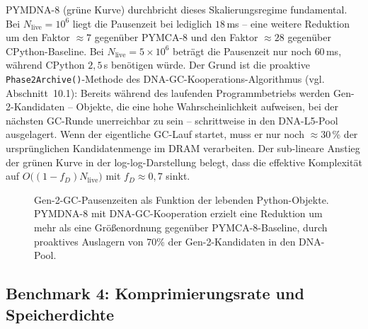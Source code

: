 ﻿\documentclass[a4paper,12pt]{article}
\theoremstyle{definition}
\begin{document}
PYMDNA-8 (grüne Kurve) durchbricht dieses Skalierungsregime fundamental. Bei $N_{\mathrm{live}} = 10^6$ liegt die Pausenzeit bei lediglich $18$\,ms -- eine weitere Reduktion um den Faktor $\approx 7$ gegenüber PYMCA-8 und den Faktor $\approx 28$ gegenüber CPython-Baseline. Bei $N_{\mathrm{live}} = 5 \times 10^6$ beträgt die Pausenzeit nur noch $60$\,ms, während CPython $2{,}5$\,s benötigen würde. Der Grund ist die proaktive \texttt{Phase2Archive()}-Methode des DNA-GC-Kooperations-Algorithmus (vgl. Abschnitt~10.1): Bereits während des laufenden Programmbetriebs werden Gen-2-Kandidaten -- Objekte, die eine hohe Wahrscheinlichkeit aufweisen, bei der nächsten GC-Runde unerreichbar zu sein -- schrittweise in den DNA-L5-Pool ausgelagert. Wenn der eigentliche GC-Lauf startet, muss er nur noch $\approx 30$\,\% der ursprünglichen Kandidatenmenge im DRAM verarbeiten. Der sub-lineare Anstieg der grünen Kurve in der log-log-Darstellung belegt, dass die effektive Komplexität auf $O\bigl((1-f_D) N_{\mathrm{live}}\bigr)$ mit $f_D \approx 0{,}7$ sinkt.

\begin{figure}[H]
  \centering
  \caption{Gen-2-GC-Pausenzeiten als Funktion der lebenden Python-Objekte.
    PYMDNA-8 mit DNA-GC-Kooperation erzielt eine Reduktion um mehr als
    eine Größenordnung gegenüber PYMCA-8-Baseline,
    durch proaktives Auslagern von 70\% der Gen-2-Kandidaten in den DNA-Pool.}
  \label{fig:gc_pausenzeiten}
\end{figure}

\subsection{Benchmark 4: Komprimierungsrate und Speicherdichte}
\end{document}
